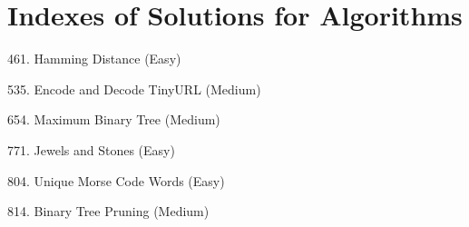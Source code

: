 \tocless\section{Indexes of Solutions for Algorithms}
\label{sec:algo_ind}

\begin{flushleft}
461. Hamming Distance (Easy)\hfill\pageref{algo:461}

535. Encode and Decode TinyURL (Medium)\hfill\pageref{algo:535}

654. Maximum Binary Tree (Medium)\hfill\pageref{algo:654}

771. Jewels and Stones (Easy)\hfill\pageref{algo:771}

804. Unique Morse Code Words (Easy)\hfill\pageref{algo:804}

814. Binary Tree Pruning (Medium)\hfill\pageref{algo:814}
\end{flushleft}

\newpage
